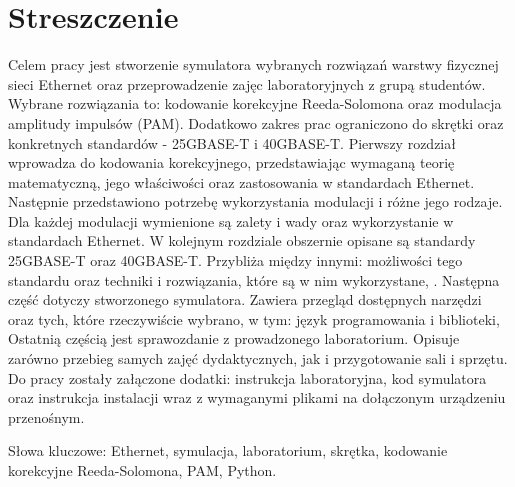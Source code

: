 \section*{Streszczenie}

Celem pracy jest stworzenie symulatora wybranych rozwiązań warstwy fizycznej sieci Ethernet oraz przeprowadzenie zajęc laboratoryjnych z grupą studentów. Wybrane rozwiązania to: kodowanie korekcyjne Reeda-Solomona oraz modulacja amplitudy impulsów (PAM). Dodatkowo zakres prac ograniczono do skrętki oraz konkretnych standardów - 25GBASE-T i 40GBASE-T. Pierwszy rozdział wprowadza do kodowania korekcyjnego, przedstawiając wymaganą teorię matematyczną, jego właściwości oraz zastosowania w standardach Ethernet. Następnie przedstawiono potrzebę wykorzystania modulacji i różne jego rodzaje. Dla każdej modulacji wymienione są zalety i wady oraz wykorzystanie w standardach Ethernet. W kolejnym rozdziale obszernie opisane są standardy 25GBASE-T oraz 40GBASE-T. Przybliża między innymi: możliwości tego standardu oraz techniki i rozwiązania, które są w nim wykorzystane, . Następna część dotyczy stworzonego symulatora. Zawiera przegląd dostępnych narzędzi oraz tych, które rzeczywiście wybrano, w tym: język programowania i biblioteki, Ostatnią częścią jest sprawozdanie z prowadzonego laboratorium. Opisuje zarówno przebieg samych zajęć dydaktycznych, jak i przygotowanie sali i sprzętu. Do pracy zostały załączone dodatki: instrukcja laboratoryjna, kod symulatora oraz instrukcja instalacji wraz z wymaganymi plikami na dołączonym urządzeniu przenośnym.

Słowa kluczowe: Ethernet, symulacja, laboratorium, skrętka, kodowanie korekcyjne Reeda-Solomona, PAM, Python.